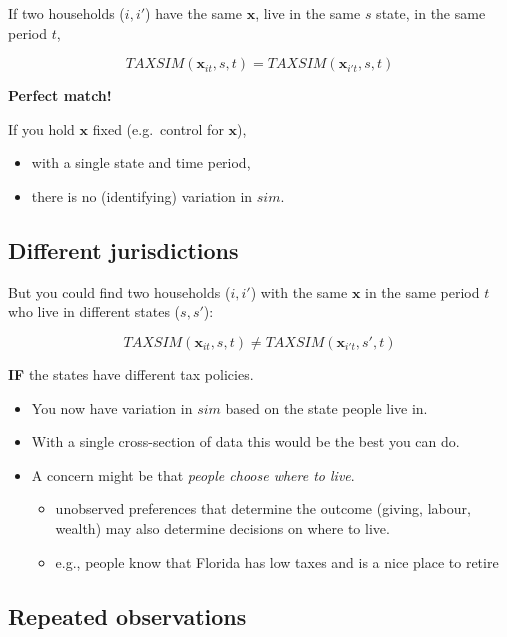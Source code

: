\documentclass[
  letterpaper,
  DIV=11,
  numbers=noendperiod]{scrartcl}
\begin{document}
If two households (\(i,i'\)) have the same \(\mathbf{x}\), live in the
same \(s\) state, in the same period \(t\),

\[
  TAXSIM(\mathbf{x}_{it},s,t) = TAXSIM(\mathbf{x}_{i't},s,t) 
\]

\textbf{Perfect match!}

If you hold \(\mathbf{x}\) fixed (e.g.~control for \(\mathbf{x}\)),

\begin{itemize}
\item
  with a single state and time period,
\item
  there is no (identifying) variation in \(sim\).
\end{itemize}

\subsection{Different jurisdictions}\label{different-jurisdictions}

But you could find two households (\(i,i'\)) with the same
\(\mathbf{x}\) in the same period \(t\) who live in different states
(\(s,s'\)):

\[
  TAXSIM(\mathbf{x}_{it},s,t) \neq TAXSIM(\mathbf{x}_{i't},s',t)
\]

\textbf{IF} the states have different tax policies.

\begin{itemize}
\item
  You now have variation in \(sim\) based on the state people live in.
\item
  With a single cross-section of data this would be the best you can do.
\item
  A concern might be that \emph{people choose where to live}.

  \begin{itemize}
  \item
    unobserved preferences that determine the outcome (giving, labour,
    wealth) may also determine decisions on where to live.
  \item
    e.g., people know that Florida has low taxes and is a nice place to
    retire
  \end{itemize}
\end{itemize}

\subsection{Repeated observations}\label{repeated-observations}
\end{document}
